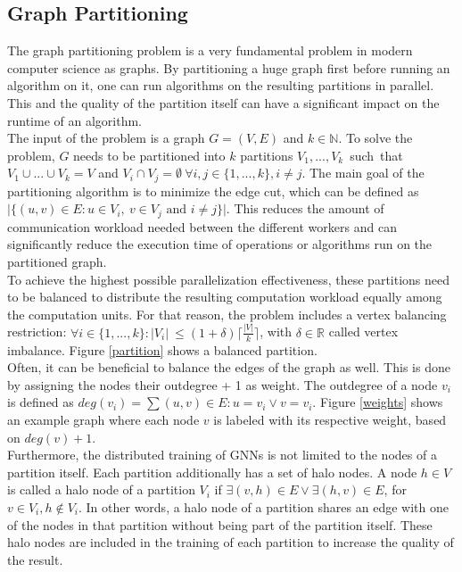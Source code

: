 \documentclass[acmsmall,nonacm,screen,review]{acmart}
\begin{document}
\subsection{Graph Partitioning}
The graph partitioning problem is a very fundamental problem in modern computer science as graphs. By partitioning a huge graph first before running an algorithm on it, one can run algorithms on the resulting partitions in parallel. This and the quality of the partition itself can have a significant impact on the runtime of an algorithm. \\ 
The input of the problem is a graph $G = (V,E)$ and $k\in \mathbb{N}$. To solve the problem, $G$ needs to be partitioned into $k$ partitions \hbox{$V_{1},...,V_{k}$ such that $V_{1}\cup...\cup V_{k} = V$} and $V_{i}\cap V_{j} = \emptyset\ \forall i,j\in \{1,...,k\}, i \neq j$. The main goal of the partitioning algorithm is to minimize the edge cut, which can be defined as $\vert \{(u,v)\in E : u\in V_{i},\ v\in V_{j} \text{ and } i\neq j \}\vert$. This reduces the amount of communication workload needed between the different workers and can significantly reduce the execution time of operations or algorithms run on the partitioned graph.  \\
To achieve the highest possible parallelization effectiveness, these partitions need to be balanced to distribute the resulting computation workload equally among the computation units. For that reason, the problem includes a vertex balancing restriction: $\forall i\in \{1,...,k\} : \vert V_{i}\vert \ \leq (1 + \delta) \lceil \frac{\vert V \vert }{k} \rceil $, with $\delta \in \mathbb{R}$ called vertex imbalance. Figure \ref{partition} shows a balanced partition. \\
Often, it can be beneficial to balance the edges of the graph as well. This is done by assigning the nodes their outdegree + 1 as weight. The outdegree of a node $v_{i}$ is defined as $deg(v_{i}) = \sum{(u,v)\in E : u = v_{i} \vee v = v_{i}}$. Figure \ref{weights} shows an example graph where each node $v$ is labeled with its respective weight, based on $deg(v) + 1$. \\
Furthermore, the distributed training of GNNs is not limited to the nodes of a partition itself. Each partition additionally has a set of halo nodes. A node $h \in V$ is called a halo node of a partition $V_{i}$ if $\exists (v,h) \in E \vee \exists (h,v) \in E$, for $v \in V_{i}, h \notin V_{i}$. In other words, a halo node of a partition shares an edge with one of the nodes in that partition without being part of the partition itself. These halo nodes are included in the training of each partition to increase the quality of the result. 
\end{document}
